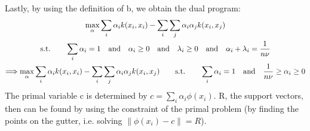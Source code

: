 \documentclass[a4paper]{article}
\newcommand{\norm}[1]{\left\lVert#1\right\rVert}
\newcommand{\1}{\mathds{1}}
\begin{document}
Lastly, by using the definition of b, we obtain the dual program:
\begin{gather*}
	\max_\alpha \sum_i \alpha_i k(x_i,x_i) - \sum_i\sum_j\alpha_i\alpha_j k(x_i,x_j)
	\\
	\text{s.t.} \quad\quad
	\sum_i\alpha_i = 1
	\quad\text{and} \quad
	\alpha_i \geq 0
	\quad\text{and} \quad
	\lambda_i \geq 0
	\quad\text{and} \quad
	\alpha_i + \lambda_i = {1\over n\nu}
	\\
	\Longrightarrow
	\max_\alpha \sum_i \alpha_i k(x_i,x_i) - \sum_i\sum_j\alpha_i\alpha_j k(x_i,x_j)
	\quad\quad\text{s.t.} \quad\quad
	\sum_i\alpha_i = 1
	\quad\text{and} \quad
	{1\over n\nu} \geq \alpha_i \geq 0
\end{gather*}
The primal variable c is determined by $c=\sum_i\alpha_i\phi(x_i)$.
R, the support vectors, then can be found by using the constraint of the primal problem 
(by finding the points on the gutter, i.e. solving $\norm{\phi(x_i)-c} = R$).
\newpage
{} 
\end{document}
